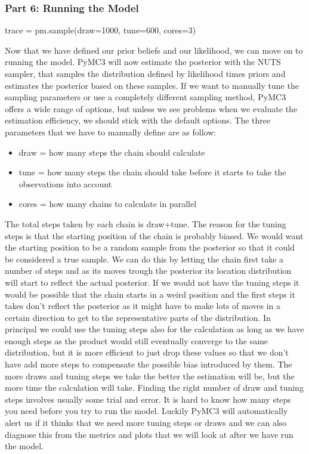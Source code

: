 \documentclass[12pt,a4paper,leqno]{report}
\theoremstyle{plain}
\theoremstyle{definition}
\theoremstyle{remark}
\begin{document}
\subsubsection*{Part 6: Running the Model}

\bigskip
\begin{pyverbatim}[][fontsize=\footnotesize]
    trace = pm.sample(draw=1000, tune=600, cores=3)
\end{pyverbatim}
\smallskip

Now that we have defined our prior beliefs and our likelihood, we can move on to running the
model. PyMC3 will now estimate the posterior with the NUTS sampler,
that samples the distribution defined by likelihood times priors and estimates the
posterior based on these samples. If we want to manually tune the sampling parameters or
use a completely different sampling method, PyMC3 offers a wide range of options, but
unless we see problems when we evaluate the estimation efficiency,
we should stick with the default options. The three parameters that we have to manually define are as follow:

\begin{itemize}
    \item[] draw = how many steps the chain should calculate
    \item[] tune = how many steps the chain should take before it starts to
    take the observations into account
    \item[] cores = how many chains to calculate in parallel
\end{itemize}

The total steps taken by each chain is draw+tune. The reason for the tuning steps is
that the starting position of the chain is probably biased. We would want the starting
position to be a random sample from the posterior so that it could be considered a true
sample. We can do this by letting the chain first take
a number of steps and as its moves trough the posterior its location distribution will start to
reflect the actual posterior. If we would not have the tuning steps it would be possible
that the chain starts in a weird position and the first steps it takes don't reflect the
posterior as it might have to make lots of moves in a certain direction to get to the
representative parts of the distribution. In principal we could use the tuning steps
also for the calculation as long as we have enough steps as the product would
still eventually converge to the same distribution, but it is more efficient to just drop these
values so that we don't have add more steps to compensate the possible bias introduced by
them. The more draws and tuning steps we take the better the estimation will be, but the
more time the calculation will take. Finding the
right number of draw and tuning steps involves usually some trial and error. It is
hard to know how many steps you need before you try to run the model. Luckily PyMC3 will
automatically alert us if it thinks that we need more tuning steps or draws and we can
also diagnose this from the metrics and plots that we will look at after we have run the
model.
\end{document}
